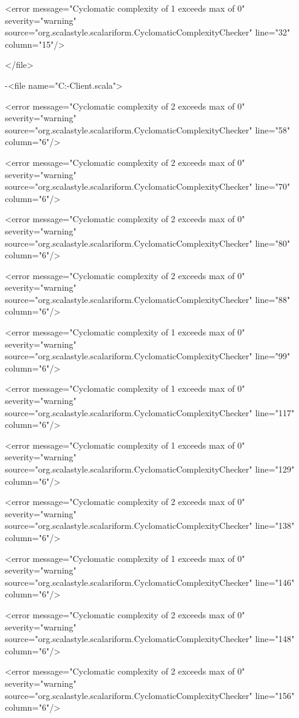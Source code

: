 \documentclass{scalatekids-article}
\begin{document}
<error message="Cyclomatic complexity of 1 exceeds max of 0" severity="warning" source="org.scalastyle.scalariform.CyclomaticComplexityChecker" line="32" column="15"/>

</file>


-<file name="C:\Users\Davide\Documents\GitHub\Actorbase-Client\src\main\scala\com\actorbase\cli\models\CommandReceiver.scala">

<error message="Cyclomatic complexity of 2 exceeds max of 0" severity="warning" source="org.scalastyle.scalariform.CyclomaticComplexityChecker" line="58" column="6"/>

<error message="Cyclomatic complexity of 2 exceeds max of 0" severity="warning" source="org.scalastyle.scalariform.CyclomaticComplexityChecker" line="70" column="6"/>

<error message="Cyclomatic complexity of 2 exceeds max of 0" severity="warning" source="org.scalastyle.scalariform.CyclomaticComplexityChecker" line="80" column="6"/>

<error message="Cyclomatic complexity of 2 exceeds max of 0" severity="warning" source="org.scalastyle.scalariform.CyclomaticComplexityChecker" line="88" column="6"/>

<error message="Cyclomatic complexity of 1 exceeds max of 0" severity="warning" source="org.scalastyle.scalariform.CyclomaticComplexityChecker" line="99" column="6"/>

<error message="Cyclomatic complexity of 1 exceeds max of 0" severity="warning" source="org.scalastyle.scalariform.CyclomaticComplexityChecker" line="117" column="6"/>

<error message="Cyclomatic complexity of 1 exceeds max of 0" severity="warning" source="org.scalastyle.scalariform.CyclomaticComplexityChecker" line="129" column="6"/>

<error message="Cyclomatic complexity of 2 exceeds max of 0" severity="warning" source="org.scalastyle.scalariform.CyclomaticComplexityChecker" line="138" column="6"/>

<error message="Cyclomatic complexity of 1 exceeds max of 0" severity="warning" source="org.scalastyle.scalariform.CyclomaticComplexityChecker" line="146" column="6"/>

<error message="Cyclomatic complexity of 2 exceeds max of 0" severity="warning" source="org.scalastyle.scalariform.CyclomaticComplexityChecker" line="148" column="6"/>

<error message="Cyclomatic complexity of 2 exceeds max of 0" severity="warning" source="org.scalastyle.scalariform.CyclomaticComplexityChecker" line="156" column="6"/>
\end{document}
